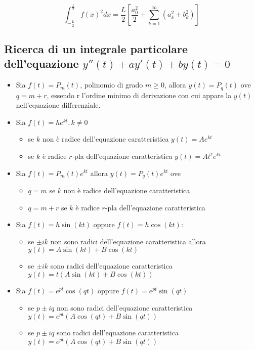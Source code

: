 \documentclass[10pt,a4paper,fleqn]{article}
\begin{document}
    \[
    \int^{\frac{L}{2}}_{-\frac{L}{2}}f(x)^2dx = \frac{L}{2}\left[\frac{a_0^2}{2} + \sum_{k=1}^{\infty}\left(a^2_k + b^2_k\right)\right]
    \]

    \subsection*{Ricerca di un integrale particolare\\dell'equazione $y''(t)+ay'(t)+by(t)=0$}

    \begin{itemize}
        \item Sia $f(t)=P_m(t)$, polinomio di grado $m \geq 0$, allora $y(t)=P_q(t)$ ove $q=m+r$, essendo r l'ordine minimo di derivazione con cui appare la $y(t)$ nell’equazione differenziale.
        \item Sia $f(t)=he^{kt}, k \not = 0$
        \begin{itemize}
            \item se $k$ non è radice dell'equazione caratteristica $y(t)=Ae^{kt}$
            \item se $k$ è radice $r$-pla dell'equazione caratteristica $y(t)=At^re^{kt}$
        \end{itemize}
        \item Sia $f(t)=P_m(t)e^{kt}$ allora $y(t)=P_q(t)e^{kt}$ ove
        \begin{itemize}
            \item $q=m$ se $k$ non è radice dell'equazione caratteristica
            \item $q=m+r$ se $k$ è radice $r$-pla dell'equazione caratteristica
        \end{itemize}
        \item Sia $f(t)=h\sin(kt)$ oppure $f(t)=h\cos(kt)$:
        \begin{itemize}
            \item se $\pm ik$ non sono radici dell'equazione caratteristica allora $y(t)=A\sin(kt)+B\cos(kt)$
            \item se $\pm ik$ sono radici dell'equazione caratteristica $y(t)=t(A\sin(kt)+B\cos(kt))$
        \end{itemize}
        \item Sia $f(t)=e^{pt} \cos(qt)$ oppure $f(t)=e^{pt} \sin(qt)$
        \begin{itemize}
            \item se $p \pm iq$ non sono radici dell'equazione caratteristica $y(t)=e^{pt} (A \cos(qt) + B \sin(qt))$
            \item se $p \pm iq$ sono radici dell'equazione caratteristica
            $y(t)=e^{pt} (A \cos(qt) + B \sin(qt))$
        \end{itemize}
    \end{itemize}
    \pagebreak
\end{document}
